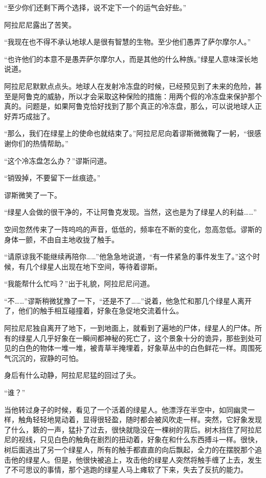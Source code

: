 “至少你们还剩下两个选择，说不定下一个的运气会好些。”

阿拉尼尼露出了苦笑。

“我现在也不得不承认地球人是很有智慧的生物。至少他们愚弄了萨尔摩尔人。”

“也许他们的本意不是愚弄萨尔摩尔人，而是其他的什么种族。”绿星人意味深长地说道。

阿拉尼尼默默点点头。地球人在发射冷冻盘的时候，已经预见到了未来的危险，甚至是阿鲁克的威胁，所以才会采取这种保险的措施：用两个假的冷冻盘来保护那个真的。问题是，如果阿鲁克恰好找到了那个真正的冷冻盘，那么，可以说地球人正好弄巧成拙了。

“那么，我们在绿星上的使命也就结束了。”阿拉尼尼向着谬斯微微鞠了一躬，“很感谢你们的热情帮助。”

“这个冷冻盘怎么办？”谬斯问道。

“销毁掉，不要留下一丝痕迹。”

谬斯微笑了一下。

“绿星人会做的很干净的，不让阿鲁克发现。当然，这也是为了绿星人的利益……”


空间忽然传来了一阵呜呜的声音，低低的，频率在不断的变化，忽高忽低。谬斯的身体一颤，不由自主地收拢了触手。

“请原谅我不能继续再陪你……”他急急地说道，“有一件紧急的事件发生了。”这个时候，有几个绿星人出现在地下空间，等待着谬斯。

“我能帮什么忙吗？”出于礼貌，阿拉尼尼问道。

“不……”谬斯稍微犹豫了一下，“还是不了……”说着，他急忙和那几个绿星人离开了，他们的触手相互碰撞着，好象在急促地交流着什么。


阿拉尼尼独自离开了地下，一到地面上，就看到了遍地的尸体，绿星人的尸体。所有的绿星人几乎好象在一瞬间都神秘的死亡了，这个景象十分的诡异，那些到处可见的白色的物体一堆一堆，被青草半掩埋着，好象草丛中的白色鲜花一样。周围死气沉沉的，寂静的可怕。

身后有什么动静，阿拉尼尼猛的回过了头。

“谁？”

当他转过身子的时候，看见了一个活着的绿星人。他漂浮在半空中，如同幽灵一样，触角轻轻地晃动着，显得很轻盈，随时都会被风吹走一样。突然，它好象发现了什么，簌的一声，猛扑了过去，很快就隐没在一棵树的背后。树木挡住了阿拉尼尼的视线，只见白色的触角在剧烈的扭动着，好象在和什么东西搏斗一样。很快，树后面逃出了另一个绿星人，所有的触手都直直的向后飘起，全力的在摆脱那个追击他的绿星人。但是，他很快被追上，攻击他的绿星人突然将触手缠了上去，发生了不可思议的事情，那个逃跑的绿星人马上瘫软了下来，失去了反抗的能力。

